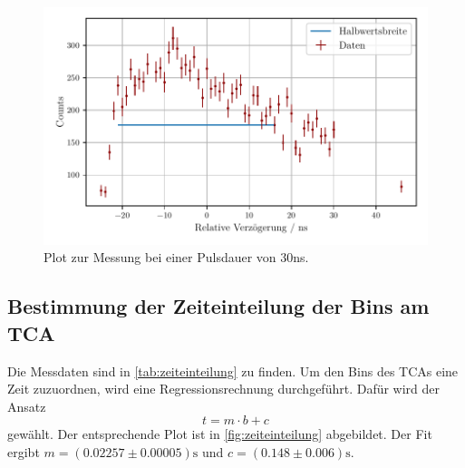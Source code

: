 \begin{figure}
    \centering
    \includegraphics[width = 0.7 \linewidth]{build/30ns_plot.pdf}
    \caption{Plot zur Messung bei einer Pulsdauer von $30$ns.}
    \label{fig:30ns_plot}
\end{figure}

\subsection{Bestimmung der Zeiteinteilung der Bins am TCA} \label{sec:zeiteinteilung}

Die Messdaten sind in \autoref{tab:zeiteinteilung} zu finden.
Um den Bins des TCAs eine Zeit zuzuordnen, wird eine Regressionsrechnung durchgeführt.
Dafür wird der Ansatz
\begin{equation*}
    t = m \cdot b + c
\end{equation*}
gewählt.
Der entsprechende Plot ist in \autoref{fig:zeiteinteilung} abgebildet.
Der Fit ergibt 
$m = (0.02257 \pm 0.00005)\unit\second$ und $c = (0.148 \pm 0.006)\unit\second$.


